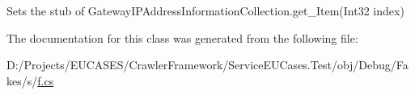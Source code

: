 Sets the stub of Gateway\-I\-P\-Address\-Information\-Collection.\-get\-\_\-\-Item(\-Int32 index)



The documentation for this class was generated from the following file\-:\begin{DoxyCompactItemize}
\item 
D\-:/\-Projects/\-E\-U\-C\-A\-S\-E\-S/\-Crawler\-Framework/\-Service\-E\-U\-Cases.\-Test/obj/\-Debug/\-Fakes/s/\hyperlink{s_2f_8cs}{f.\-cs}\end{DoxyCompactItemize}
